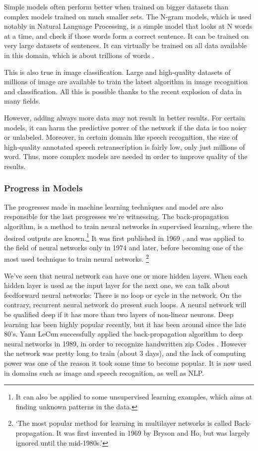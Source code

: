 \documentclass[12pt]{article}
\begin{document}
Simple models often perform better when trained on bigger datasets
\cite{moreData} than complex models trained on much smaller sets. The N-gram
models, which is used notably in Natural Language Processing, is a simple model
that looks at N words at a time, and check if those words form a correct
sentence. It can be trained on very large datasets of sentences. It can
virtually be trained on all data available in this domain, which is about
trillions of words \cite{ngram}.

This is also true in image classification. Large and high-quality datasets of
millions of image are available to train the latest algorithm in image
recognition and classification. All this is possible thanks to the recent
explosion of data in many fields.

However, adding always more data may not result in better results. For certain
models, it can harm the predictive power of the network if the data is too noisy
or unlabeled. \cite{trainingData} Moreover, in certain domain like speech
recognition, the size of high-quality annotated speech retranscription is fairly
low, only just millions of word. Thus, more complex models are needed in order
to improve quality of the results.


\subsubsection{Progress in Models}

The progresses made in machine learning techniques and model are also
responsible for the last progresses we're witnessing. The back-propagation
algorithm, is a method to train neural networks in supervised learning, where
the desired outputs are known.\footnote{It can also be applied to some
unsupervised learning examples, which aims at finding unknown patterns in the
data.} It was first published in 1969 \cite{backpropagation}, and was applied to
the field of neural networks only in 1974 and later, before becoming one of the
most used technique to train neural networks.
\footnote{\lq The most popular
method for learning in multilayer networks is called Back-propagation. It was
first invented in 1969 by Bryson and Ho, but was largely ignored until the
mid-1980s.\rq  \cite{RusselAI}}

We've seen that neural network can have one or more hidden layers. When each
hidden layer is used as the input layer for the next one, we can talk about
feedforward neural networks: There is no loop or cycle in the network. On the
contrary, recurrent neural network do present such loops. A neural network
will be qualified deep if it has more than two layers of non-linear neurons.
Deep learning has been highly popular recently, but it has been around since the late
80's. Yann LeCun successfully applied the back-propagation algorithm to deep neural
networks in 1989, in order to recognize handwritten zip Codes \cite{lecun}.
However the network was pretty long to train (about 3 days), and the lack of computing
power was one of the reason it took some time to become popular. It is now
used in domains such as image and speech recognition, as well as NLP.
\end{document}
